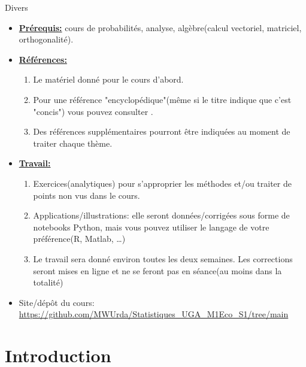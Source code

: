 \begin{frame}[allowframebreaks]{Divers}
    \begin{itemize}
        \item \textbf{\underline{Prérequis:}} cours de probabilités, analyse, algèbre(calcul vectoriel, matriciel, orthogonalité).
        \item \textbf{\underline{Références:}} 
        \begin{enumerate}[-]
            \item Le matériel donné pour le cours d'abord.
            \item Pour une référence "encyclopédique"(même si le titre indique que c'est "concis") 
            vous pouvez consulter  \cite{Wasserman2004}.
            \item Des références supplémentaires pourront être indiquées au moment de traiter chaque thème.
        \end{enumerate}
        \framebreak
        \item \textbf{\underline{Travail:}} \begin{enumerate}
            \item Exercices(analytiques) pour s'approprier les méthodes et/ou traiter 
            de points non vus dans le cours.
            \item Applications/illustrations: elle seront données/corrigées sous forme de notebooks
             Python, mais vous pouvez utiliser le langage de votre préférence(R, Matlab, \ldots)
             \item Le travail sera donné environ toutes les deux semaines. 
             Les corrections seront mises en ligne et ne se feront pas en séance(au moins dans la totalité)
        \end{enumerate}
        \framebreak
        \item Site/dépôt du cours: 
        \medskip
        \url{https://github.com/MWUrda/Statistiques_UGA_M1Eco_S1/tree/main}
    
    \end{itemize}
    \end{frame}

\section{Introduction}
\frame{\sectionpage}

